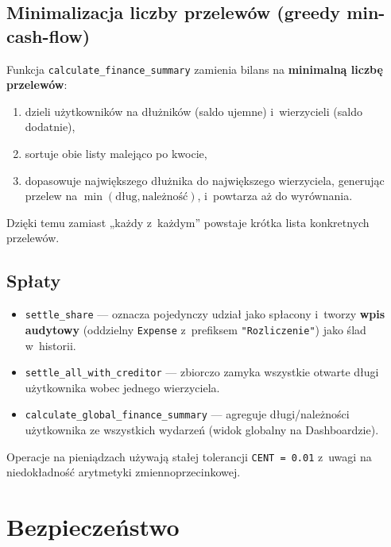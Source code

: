 \documentclass[11pt,a4paper]{article}
\begin{document}
\subsection{Minimalizacja liczby przelewów (greedy min-cash-flow)}
Funkcja \texttt{calculate\_finance\_summary} zamienia bilans na \textbf{minimalną liczbę
przelewów}:
\begin{enumerate}[noitemsep]
    \item dzieli użytkowników na dłużników (saldo ujemne) i~wierzycieli (saldo dodatnie),
    \item sortuje obie listy malejąco po kwocie,
    \item dopasowuje największego dłużnika do największego wierzyciela, generując przelew na
          $\min(\text{dług}, \text{należność})$, i~powtarza aż do wyrównania.
\end{enumerate}
Dzięki temu zamiast „każdy z~każdym” powstaje krótka lista konkretnych przelewów.

\subsection{Spłaty}
\begin{itemize}[noitemsep]
    \item \texttt{settle\_share} --- oznacza pojedynczy udział jako spłacony i~tworzy
          \textbf{wpis audytowy} (oddzielny \texttt{Expense} z~prefiksem \texttt{"Rozliczenie"})
          jako ślad w~historii.
    \item \texttt{settle\_all\_with\_creditor} --- zbiorczo zamyka wszystkie otwarte długi
          użytkownika wobec jednego wierzyciela.
    \item \texttt{calculate\_global\_finance\_summary} --- agreguje długi/należności
          użytkownika ze wszystkich wydarzeń (widok globalny na Dashboardzie).
\end{itemize}

\noindent Operacje na pieniądzach używają stałej tolerancji \texttt{CENT = 0.01} z~uwagi na
niedokładność arytmetyki zmiennoprzecinkowej.

\section{Bezpieczeństwo}
\end{document}
